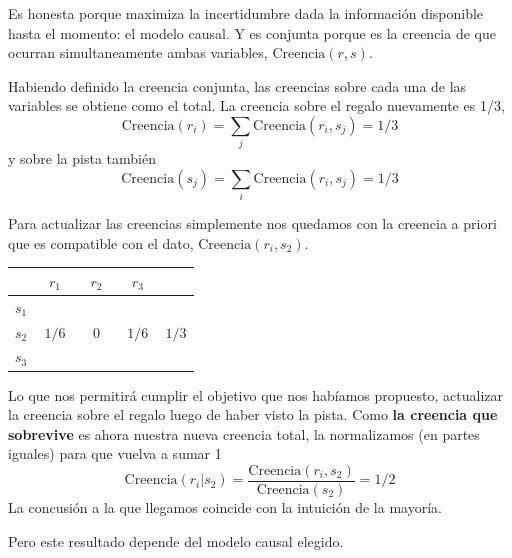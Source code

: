 \documentclass[a4paper,10pt]{book}
\theoremstyle{definition}
\begin{document}
Es honesta porque maximiza la incertidumbre dada la información disponible hasta el momento: el modelo causal.
Y es conjunta porque es la creencia de que ocurran simultaneamente ambas variables, $\text{Creencia}(r,s)$.


Habiendo definido la creencia conjunta, las creencias sobre cada una de las variables se obtiene como el total.
La creencia sobre el regalo nuevamente es 1/3,
\begin{equation}
\text{Creencia}(r_i) = \sum_j \text{Creencia}(r_i, s_j) = 1/3
\end{equation}
y sobre la pista también
\begin{equation}
\text{Creencia}(s_j) = \sum_i \text{Creencia}(r_i, s_j) = 1/3
\end{equation}


Para actualizar las creencias simplemente nos quedamos con la creencia a priori que es compatible con el dato, $\text{Creencia}(r_i, s_2)$.
%
\begin{table}[H]
\centering
 \begin{tabular}{c|c|c|c|c} \setlength\tabcolsep{0.4cm} 
        & \, $r_1$ \, &  \, $r_2$ \, & \, $r_3$ \, & \\ \hline 
  $s_1$ &  &  & & \\ \hline
  $s_2$ & $1/6$ & $0$ & $1/6$ & $1/3$ \\ \hline
  $s_3$ &  &  &  & \\ \hline 
  \end{tabular}
\end{table}
%
Lo que nos permitirá cumplir el objetivo que nos habíamos propuesto, actualizar la creencia sobre el regalo luego de haber visto la pista.
Como \textbf{la creencia que sobrevive} es ahora nuestra nueva creencia total, la normalizamos (en partes iguales) para que vuelva a sumar 1
%
\begin{equation}
\text{Creencia}(r_i| s_2) = \frac{\text{Creencia}(r_i, s_2)}{\text{Creencia}(s_2)} = 1/2
\end{equation}
%
La concusión a la que llegamos coincide con la intuición de la mayoría.
\begin{figure}[H]
\centering
{}
\end{figure}
%
Pero este resultado depende del modelo causal elegido.
\end{document}
